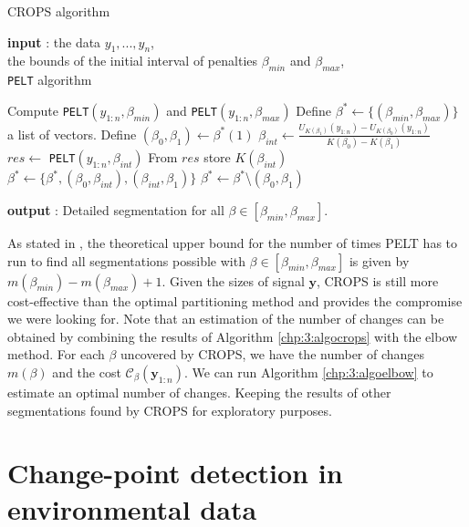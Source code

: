 \begin{algorithm}[ht]
\caption{CROPS algorithm}\label{chp:3:algocrops}
\begin{algorithmic}

\State \textbf{input} : the data $y_{1},...,y_{n}$, \\
the bounds of the initial interval of penalties $\beta_{min}$ and $\beta_{max}$, \\
\texttt{PELT} algorithm 
  
\State Compute \texttt{PELT}$(y_{1:n},\beta_{min})$ and \texttt{PELT}$(y_{1:n},\beta_{max})$ 
\State Define $\beta^* \gets \{(\beta_{min},\beta_{max})\}$ a list of vectors.  
\While{$\beta^*\neq \emptyset$}
  \State Define $(\beta_0, \beta_1) \gets \beta^*(1)$
    \State $\beta_{int} \gets \frac{U_{K(\beta_1)}(y_{1:n})-U_{K(\beta_0)}(y_{1:n})}{K(\beta_0)-K(\beta_1)}$
    \State $res \gets$ \texttt{PELT}$(y_{1:n},\beta_{int})$
    \State From $res$ store $K(\beta_{int})$
      \State $\beta^* \gets \{\beta^*,(\beta_0,\beta_{int}),(\beta_{int},\beta_1)\}$
    \EndIf
  \EndIf
  \State $\beta^* \gets \beta^*$\textbackslash$(\beta_0,\beta_1)$
\EndWhile 
   
\State \textbf{output} : Detailed segmentation for all $\beta \in [\beta_{min},\beta_{max}]$. 
\end{algorithmic}
\end{algorithm} 

As stated in \cite{haynes2017}, the theoretical upper bound for the number of times PELT has to run to find all segmentations possible with $\beta\in[\beta_{min},\beta_{max}]$ is given by $m(\beta_{min})-m(\beta_{max})+1$. Given the sizes of signal $\bm y$, CROPS is still more cost-effective than the optimal partitioning method and provides the compromise we were looking for. Note that an estimation of the number of changes can be obtained by combining the results of Algorithm  \ref{chp:3:algocrops} with the elbow method. For each $\beta$ uncovered by CROPS, we have the number of changes $m(\beta)$ and the cost $\mathcal{C}_{\beta}(\bm y_{1:n})$. We can run Algorithm \ref{chp:3:algoelbow} to estimate an optimal number of changes. Keeping the results of other segmentations found by CROPS for exploratory purposes. 

\section{Change-point detection in environmental data}\label{chp:3:5}

